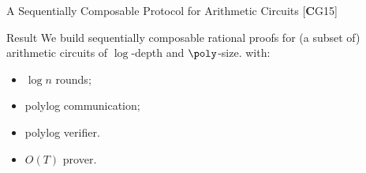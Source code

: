 \begin{frame}{A Sequentially Composable Protocol for Arithmetic Circuits [\textbf{C}G15]}
		\begin{block}{\large{Result}}
		\large{We build sequentially composable rational proofs for (a subset of) arithmetic circuits of $\log$-depth and $\poly$-size.} with:
		\begin{itemize}
			\item $\log n$ rounds;
			\item polylog communication;
			\item polylog verifier.
			\item $O(T)$ prover.
		\end{itemize}
		\end{block}
\end{frame}



